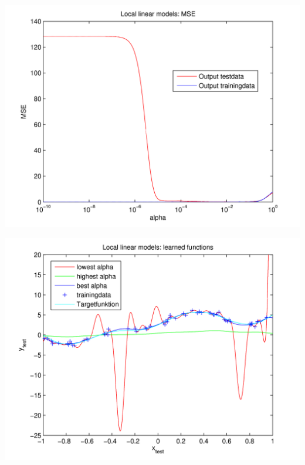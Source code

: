   \begin{center}
	\includegraphics[width=15cm]{figures/114/local_mse.png}
	\label{fig:local_mse}
  \end{center}

  \begin{center}
	\includegraphics[width=15cm]{figures/114/local_learned.png}
	\label{fig:local_learned}
  \end{center}

